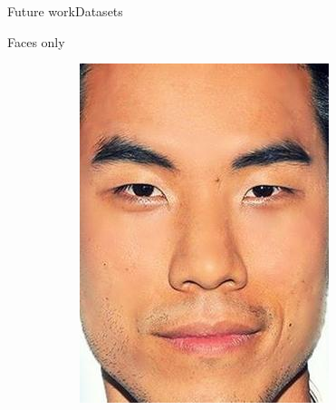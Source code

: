 \begin{frame}{Future work}{Datasets}
\begin{block}{Faces only}
\begin{figure}
\begin{subfigure}[b]{0.15\textwidth}
                \includegraphics[width=\textwidth]{sections/malte_slides/crop2}
            \end{subfigure}
            \begin{subfigure}[b]{0.15\textwidth}
                \centering

\end{subfigure}
\end{figure}
\end{block}
\end{frame}
